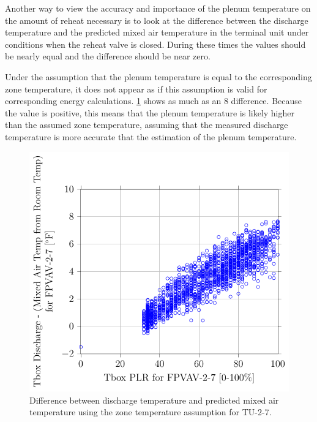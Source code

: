 Another way to view the accuracy and importance of the plenum
temperature on the amount of reheat necessary is to look at the
difference between the discharge temperature and the predicted mixed air
temperature in the terminal unit under conditions when the reheat valve
is closed.  During these times the values should be nearly equal and the
difference should be near zero. 

Under the assumption that the plenum temperature is equal to the
corresponding zone temperature, it does not appear as if this assumption
is valid for corresponding energy calculations. \figref{}
\ref{fig:2017-01-09-1412-TboxDischargeMixedAirTempfromRoomTempforFPVAV27vsTboxPLRforFPVAV27}
shows as much as an \SI{8}{\degreeF} difference. Because the value is
positive, this means that the plenum temperature is likely higher than
the assumed zone temperature, assuming that the measured discharge
temperature is more accurate that the estimation of the plenum
temperature. 

\begin{figure}
\centering
\includegraphics[]{Plots/2017-01-09-1412-TboxDischargeMixedAirTempfromRoomTempforFPVAV27vsTboxPLRforFPVAV27.pdf}
\caption{Difference between discharge temperature and predicted mixed
air temperature using the zone temperature assumption for TU-2-7.}
\label{fig:2017-01-09-1412-TboxDischargeMixedAirTempfromRoomTempforFPVAV27vsTboxPLRforFPVAV27}
\end{figure}

